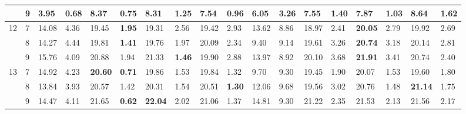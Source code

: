 \documentclass[conference]{IEEEtran}
\begin{document}
\begin{table}[]
\begin{tabular}{|cl|ll|ll|ll|ll|ll|ll|ll|ll|}
		\multicolumn{1}{|c|}{} & 9 & \multicolumn{1}{l|}{3.95} & \textbf{0.68} & \multicolumn{1}{l|}{8.37} & 0.75 & \multicolumn{1}{l|}{8.31} & 1.25 & \multicolumn{1}{l|}{7.54} & 0.96 & \multicolumn{1}{l|}{6.05} & 3.26 & \multicolumn{1}{l|}{7.55} & 1.40 & \multicolumn{1}{l|}{7.87} & 1.03 & \multicolumn{1}{l|}{\textbf{8.64}} & 1.62 \\ \hline
		\multicolumn{1}{|c|}{\multirow{3}{*}{12}} & 7 & \multicolumn{1}{l|}{14.08} & 4.36 & \multicolumn{1}{l|}{19.45} & \textbf{1.95} & \multicolumn{1}{l|}{19.31} & 2.56 & \multicolumn{1}{l|}{19.42} & 2.93 & \multicolumn{1}{l|}{13.62} & 8.86 & \multicolumn{1}{l|}{18.97} & 2.41 & \multicolumn{1}{l|}{\textbf{20.05}} & 2.79 & \multicolumn{1}{l|}{19.92} & 2.69 \\ \cline{2-18} 
		\multicolumn{1}{|c|}{} & 8 & \multicolumn{1}{l|}{14.27} & 4.44 & \multicolumn{1}{l|}{19.81} & \textbf{1.41} & \multicolumn{1}{l|}{19.76} & 1.97 & \multicolumn{1}{l|}{20.09} & 2.34 & \multicolumn{1}{l|}{9.40} & 9.14 & \multicolumn{1}{l|}{19.61} & 3.26 & \multicolumn{1}{l|}{\textbf{20.74}} & 3.18 & \multicolumn{1}{l|}{20.14} & 2.81 \\ \cline{2-18} 
		\multicolumn{1}{|c|}{} & 9 & \multicolumn{1}{l|}{15.76} & 4.09 & \multicolumn{1}{l|}{20.88} & 1.94 & \multicolumn{1}{l|}{21.33} & \textbf{1.46} & \multicolumn{1}{l|}{19.90} & 2.88 & \multicolumn{1}{l|}{13.97} & 8.92 & \multicolumn{1}{l|}{20.10} & 3.68 & \multicolumn{1}{l|}{\textbf{21.91}} & 3.41 & \multicolumn{1}{l|}{20.74} & 2.40 \\ \hline
		\multicolumn{1}{|c|}{\multirow{3}{*}{13}} & 7 & \multicolumn{1}{l|}{14.92} & 4.23 & \multicolumn{1}{l|}{\textbf{20.60}} & \textbf{0.71} & \multicolumn{1}{l|}{19.86} & 1.53 & \multicolumn{1}{l|}{19.84} & 1.32 & \multicolumn{1}{l|}{9.70} & 9.30 & \multicolumn{1}{l|}{19.45} & 1.90 & \multicolumn{1}{l|}{20.07} & 1.53 & \multicolumn{1}{l|}{19.60} & 1.80 \\ \cline{2-18} 
		\multicolumn{1}{|c|}{} & 8 & \multicolumn{1}{l|}{13.84} & 3.93 & \multicolumn{1}{l|}{20.57} & 1.42 & \multicolumn{1}{l|}{20.31} & 1.54 & \multicolumn{1}{l|}{20.51} & \textbf{1.30} & \multicolumn{1}{l|}{12.06} & 9.68 & \multicolumn{1}{l|}{19.56} & 3.02 & \multicolumn{1}{l|}{20.76} & 1.48 & \multicolumn{1}{l|}{\textbf{21.14}} & 1.75 \\ \cline{2-18} 
		\multicolumn{1}{|c|}{} & 9 & \multicolumn{1}{l|}{14.47} & 4.11 & \multicolumn{1}{l|}{21.65} & \textbf{0.62} & \multicolumn{1}{l|}{\textbf{22.04}} & 2.02 & \multicolumn{1}{l|}{21.06} & 1.37 & \multicolumn{1}{l|}{14.81} & 9.30 & \multicolumn{1}{l|}{21.22} & 2.35 & \multicolumn{1}{l|}{21.53} & 2.13 & \multicolumn{1}{l|}{21.56} & 2.17 \\ \hline

\end{tabular}
\end{table}
\end{document}
